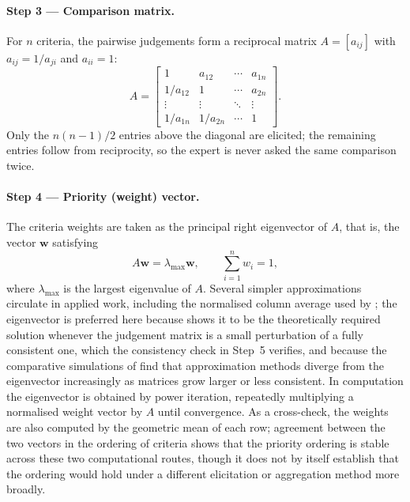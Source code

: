 \paragraph{Step 3 --- Comparison matrix.}
For $n$ criteria, the pairwise judgements form a reciprocal matrix
$A = [a_{ij}]$ with $a_{ij} = 1/a_{ji}$ and $a_{ii} = 1$:
\begin{equation}\label{eq:pcm}
  A = \begin{bmatrix}
    1 & a_{12} & \cdots & a_{1n} \\
    1/a_{12} & 1 & \cdots & a_{2n} \\
    \vdots & \vdots & \ddots & \vdots \\
    1/a_{1n} & 1/a_{2n} & \cdots & 1
  \end{bmatrix}.
\end{equation}
Only the $n(n-1)/2$ entries above the diagonal are elicited; the remaining entries follow
from reciprocity, so the expert is never asked the same comparison twice.

\paragraph{Step 4 --- Priority (weight) vector.}
The criteria weights are taken as the principal right eigenvector of $A$, that is, the
vector $\mathbf{w}$ satisfying
\begin{equation}\label{eq:weight}
  A\mathbf{w} = \lambda_{\max}\mathbf{w}, \qquad \sum_{i=1}^{n} w_i = 1,
\end{equation}
where $\lambda_{\max}$ is the largest eigenvalue of $A$. Several simpler approximations
circulate in applied work, including the normalised column average used by
\textcite{weng_siew_lam_evaluation_2023}; the eigenvector is preferred here because
\textcite{saaty_decisionmaking_2003} shows it to be the theoretically required solution
whenever the judgement matrix is a small perturbation of a fully consistent one, which the
consistency check in Step~5 verifies, and because the comparative simulations of
\textcite{ishizaka_how_2006} find that approximation methods diverge from the eigenvector
increasingly as matrices grow larger or less consistent. In computation the eigenvector is
obtained by power iteration, repeatedly multiplying a normalised weight vector by $A$
until convergence. As a cross-check, the weights are also computed by the geometric mean
of each row; agreement between the two vectors in the ordering of criteria shows that the
priority ordering is stable across these two computational routes, though it does not by
itself establish that the ordering would hold under a different elicitation or aggregation
method more broadly.

